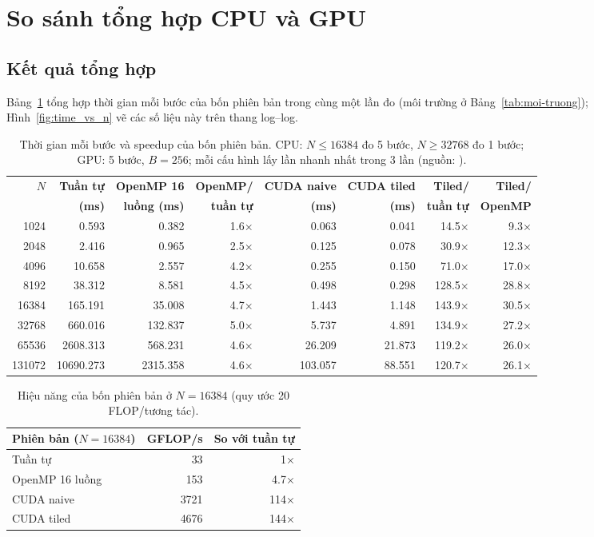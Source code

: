 \section{So sánh tổng hợp CPU và GPU}
\label{sec:tong-hop}

\subsection{Kết quả tổng hợp}

Bảng~\ref{tab:tong-hop} tổng hợp thời gian mỗi bước của bốn phiên bản trong cùng một lần đo (môi trường ở Bảng~\ref{tab:moi-truong}); Hình~\ref{fig:time_vs_n} vẽ các số liệu này trên thang log--log.

\begin{table}[H]
\centering\small
\setlength{\tabcolsep}{3pt}
\begin{tabular}{rrrrrrrr}
\toprule
\textbf{$N$} & \textbf{Tuần tự} & \textbf{OpenMP 16} & \textbf{OpenMP/} & \textbf{CUDA naive} & \textbf{CUDA tiled} & \textbf{Tiled/} & \textbf{Tiled/} \\
 & \textbf{(ms)} & \textbf{luồng (ms)} & \textbf{tuần tự} & \textbf{(ms)} & \textbf{(ms)} & \textbf{tuần tự} & \textbf{OpenMP} \\
\midrule
1024 & 0.593 & 0.382 & 1.6× & 0.063 & 0.041 & 14.5× & 9.3× \\
2048 & 2.416 & 0.965 & 2.5× & 0.125 & 0.078 & 30.9× & 12.3× \\
4096 & 10.658 & 2.557 & 4.2× & 0.255 & 0.150 & 71.0× & 17.0× \\
8192 & 38.312 & 8.581 & 4.5× & 0.498 & 0.298 & 128.5× & 28.8× \\
16384 & 165.191 & 35.008 & 4.7× & 1.443 & 1.148 & 143.9× & 30.5× \\
32768 & 660.016 & 132.837 & 5.0× & 5.737 & 4.891 & 134.9× & 27.2× \\
65536 & 2608.313 & 568.231 & 4.6× & 26.209 & 21.873 & 119.2× & 26.0× \\
131072 & 10690.273 & 2315.358 & 4.6× & 103.057 & 88.551 & 120.7× & 26.1× \\
\bottomrule
\end{tabular}
\caption{Thời gian mỗi bước và speedup của bốn phiên bản. CPU: $N \le 16384$ đo 5 bước, $N \ge 32768$ đo 1 bước; GPU: 5 bước, $B=256$; mỗi cấu hình lấy lần nhanh nhất trong 3 lần (nguồn: ).}
\label{tab:tong-hop}
\end{table}

\begin{table}[H]
\centering\small
\begin{tabular}{lrr}
\toprule
\textbf{Phiên bản ($N=16384$)} & \textbf{GFLOP/s} & \textbf{So với tuần tự} \\
\midrule
Tuần tự & 33 & 1× \\
OpenMP 16 luồng & 153 & 4.7× \\
CUDA naive & 3721 & 114× \\
CUDA tiled & 4676 & 144× \\
\bottomrule
\end{tabular}
\caption{Hiệu năng của bốn phiên bản ở $N=16384$ (quy ước 20 FLOP/tương tác).}
\label{tab:gflops}
\end{table}


